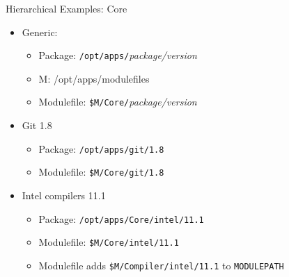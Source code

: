 \documentclass{beamer}
\begin{document}
\begin{frame}{Hierarchical Examples: Core}
  \begin{itemize}
    \item Generic:
      \begin{itemize}
        \item Package: \texttt{/opt/apps/}\emph{package/version}
        \item M: {\color{blue}/opt/apps/modulefiles}
        \item Modulefile: \texttt{{\color{blue}\$M}/Core/}\emph{package/version}
      \end{itemize}
    \item Git 1.8
      \begin{itemize}
        \item Package: \texttt{/opt/apps/git/1.8}
        \item Modulefile: \texttt{{\color{blue}\$M}/Core/git/1.8}
      \end{itemize}
    \item Intel compilers 11.1
      \begin{itemize}
        \item Package: \texttt{/opt/apps/Core/intel/11.1}
        \item Modulefile: \texttt{{\color{blue}\$M}/Core/intel/11.1}
        \item Modulefile adds \texttt{{\color{blue}\$M}/Compiler/intel/11.1} to \texttt{MODULEPATH}
      \end{itemize}
  \end{itemize}
\end{frame}
\end{document}
